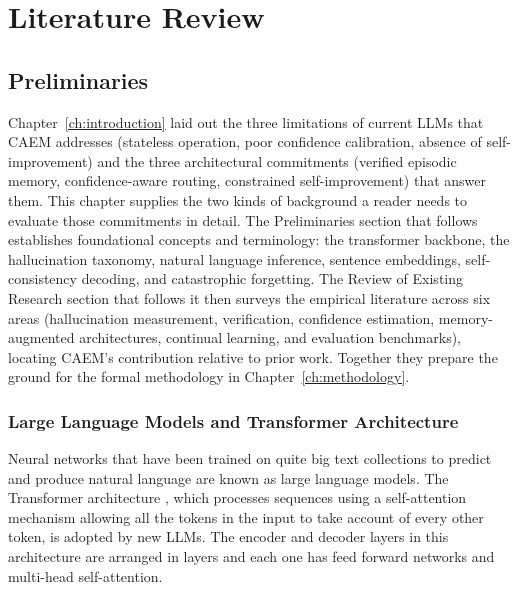 \chapter{Literature Review}
\label{ch:literature-review}

\section{Preliminaries}

Chapter~\ref{ch:introduction} laid out the three limitations of current LLMs that CAEM addresses (stateless operation, poor confidence calibration, absence of self-improvement) and the three architectural commitments (verified episodic memory, confidence-aware routing, constrained self-improvement) that answer them. This chapter supplies the two kinds of background a reader needs to evaluate those commitments in detail. The Preliminaries section that follows establishes foundational concepts and terminology: the transformer backbone, the hallucination taxonomy, natural language inference, sentence embeddings, self-consistency decoding, and catastrophic forgetting. The Review of Existing Research section that follows it then surveys the empirical literature across six areas (hallucination measurement, verification, confidence estimation, memory-augmented architectures, continual learning, and evaluation benchmarks), locating CAEM's contribution relative to prior work. Together they prepare the ground for the formal methodology in Chapter~\ref{ch:methodology}.

\subsection{Large Language Models and Transformer Architecture}

Neural networks that have been trained on quite big text collections to predict and produce natural language are known as large language models. The Transformer architecture \cite{NIPS2017_3f5ee243}, which processes sequences using a self-attention mechanism allowing all the tokens in the input to take account of every other token, is adopted by new LLMs. The encoder and decoder layers in this architecture are arranged in layers and each one has feed forward networks and multi-head self-attention.


